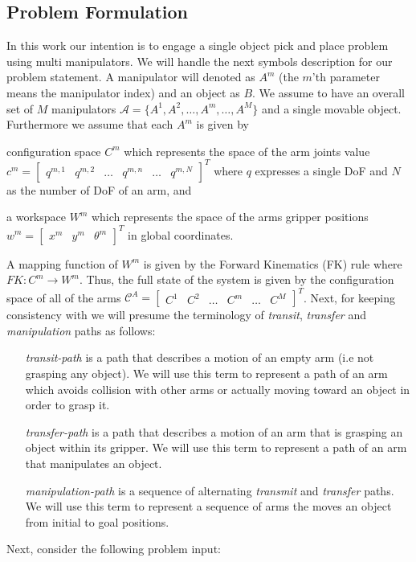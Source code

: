 \subsection{Problem Formulation}
In this work our intention is to engage a single object pick and place problem using multi manipulators. We will handle the next symbols description for our problem statement. A manipulator will denoted as $A^{m}$ (the $m$'th parameter means the manipulator index) and an object as $B$. We assume to have an overall set of $M$ manipulators  $\mathcal{A}=\{A^{1},A^{2},\dots,A^m, \dots,A^{M}\}$ and a single movable object. Furthermore we assume that each $A^m$ is given by
\begin{inparaenum}
\item configuration space $C^{m}$ which represents the space of the arm joints value $c^{m} = \begin{bmatrix} q^{m,1} & q^{m,2} & \dots & q^{m,n} & \dots & q^{m,N} \end{bmatrix}^T$ where $q$ expresses a single DoF and $N$ as the number of DoF of an arm, and
\item a workspace $W^m$ which represents the space of the arms gripper positions $w^m= \begin{bmatrix} x^m & y^m & \theta^m \end{bmatrix}^T$ in global coordinates.
\end{inparaenum}  
A mapping function of $W^m$ is given by the Forward Kinematics (FK) rule where $FK:C^m\rightarrow W^m$. Thus, the full state of the system is given by the configuration space of all of the arms $\mathcal{C}^A=\begin{bmatrix} C^1 & C^2 & \dots & C^m & \dots & C^M\end{bmatrix}^T$. Next, for keeping consistency with \cite{koga1994multi,koga1992} we will presume the terminology of \textit{transit}, \textit{transfer} and \textit{manipulation} paths as follows:
\begin{itemize}
\item[\textit{transit-path}] is a path that describes a motion of an empty arm (i.e not grasping any object). We will use this term to represent a path of an arm which avoids collision with other arms or actually moving toward an object in order to grasp it.

\item[\textit{transfer-path}] is a path that describes a motion of an arm that is grasping an object within its gripper. We will use this term to represent a path of an arm that manipulates an object.

\item[\textit{manipulation-path}]  is a sequence of alternating \textit{transmit} and \textit{transfer} paths. We will use this term to represent a sequence of arms the moves an object from initial to goal positions.

\end{itemize}
Next, consider the following problem input:


